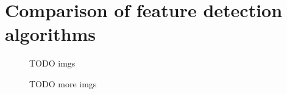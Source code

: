 \section{Comparison of feature detection algorithms}\label{apdx:cv-algos}

\begin{figure}[H]
\centering
TODO imgs

\end{figure}


\begin{figure}[H]
\centering
TODO more imgs

\end{figure}